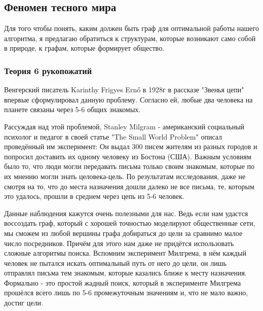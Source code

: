 \subsection{Феномен тесного мира}

Для того чтобы понять, каким должен быть граф для 
оптимальной работы нашего алгоритма, я предлагаю обратиться
к структурам, которые возникают само собой в приро\-де, 
к графам, которые формирует общество.

\subsubsection{Теория 6 рукопожатий}

Венгерский писатель Karinthy Frigyes Ernő в 1928г в рассказе 
"Звенья цепи" впервые сформулировал данную проблему. Согласно ей, 
любые два человека на планете связаны через 5-6 общих знакомых.

Рассуждая над этой проблемой, Stanley Milgram - американский 
социальный психолог и педагог в своей статье "The Small World Problem" \cite{Milgram}
описал проведённый им экспе\-римент: 
Он выдал 300 писем жителям из разных городов и попросил доставить 
их одному человеку из Бостона (США). Важным условиям было то, что
люди могли передавать письма только своим знакомым, которые по их
мнению могли знать целовека-цель.
По результатам ис\-следования, даже не смотря на то, что до места назначения
дошли далеко не все письма, те, которым это удалось, прошли в среднем через цепь из
5-6 человек. 

Данные наблюдения кажутся очень полезными для нас. Ведь если нам
удастся вос\-создать граф, который с хорошей точностью моделируют
общественные сети, мы сможем из любой вершины графа добираться до 
цели за сравнимо малое число посредников. Причём для этого нам даже 
не придётся использовать сложные алгоритмы поиска. Вспом\-ним эксперимент
Милгрема, в нём каждый человек не пытался искать оптимальный путь
от него до цели, он лишь отправлял письма тем знакомым, которые казались
ближе к месту назначения. Формально - это простой жадный поиск, который
в эксперименте Милгрема прошёлся всего лишь по 5-6 промежуточным значениям
и, что не мало важно, достиг цели.



